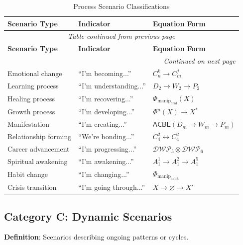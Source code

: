 \documentclass[11pt,twoside]{book}
\renewcommand{\arraystretch}{1.2}  %
\newcommand{\Frac}{\Phi}
\newcommand{\ACBE}{\mathsf{ACBE}}
\newcommand{\ManipFrac}{\Phi_{\mathrm{manip}}}
\newcommand{\DWP}{\mathcal{DWP}}
\begin{document}
\begin{center}
\small
\renewcommand{\arraystretch}{1.3}
\begin{longtable}{p{2.5cm}|p{3cm}|p{4cm}}
\caption{Process Scenario Classifications} \\
\toprule
\textbf{Scenario Type} & \textbf{Indicator} & \textbf{Equation Form} \\
\midrule
\endfirsthead
\multicolumn{3}{c}{\textit{Table continued from previous page}} \\
\toprule
\textbf{Scenario Type} & \textbf{Indicator} & \textbf{Equation Form} \\
\midrule
\endhead
\midrule
\multicolumn{3}{r}{\textit{Continued on next page}} \\
\endfoot
\bottomrule
\endlastfoot
Emotional change & ``I'm becoming...'' & $C_n^k \to C_m^j$ \\
Learning process & ``I'm understanding...'' & $D_2 \to W_2 \to P_2$ \\
Healing process & ``I'm recovering...'' & $\ManipFrac_{\mathrm{heal}}(X)$ \\
Growth process & ``I'm developing...'' & $\Frac^n(X) \to X^*$ \\
Manifestation & ``I'm creating...'' & $\ACBE(D_m \to W_m \to P_m)$ \\
Relationship forming & ``We're bonding...'' & $C_4^2 \leftrightarrow C_4^2$ \\
Career advancement & ``I'm progressing...'' & $\DWP_5 \otimes \DWP_6$ \\
Spiritual awakening & ``I'm awakening...'' & $A_1^1 \to A_1^2 \to A_1^5$ \\
Habit change & ``I'm changing...'' & $\ManipFrac_{\mathrm{habit}}$ \\
Crisis transition & ``I'm going through...'' & $X \to \varnothing \to X'$ \\
\end{longtable}
\end{center}

\subsection{Category C: Dynamic Scenarios}

\textbf{Definition}: Scenarios describing ongoing patterns or cycles.
\end{document}
